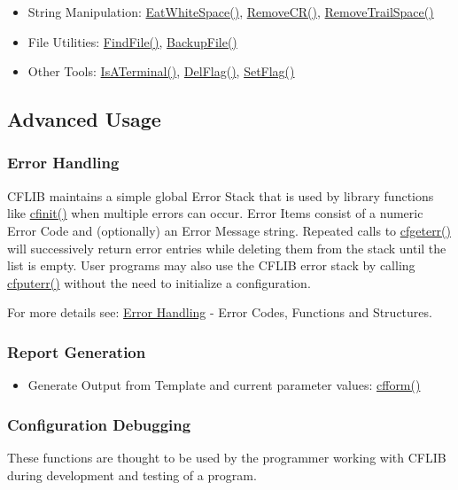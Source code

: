 \begin{itemize}
\item String Manipulation: \hyperlink{group__utilities_gb6760d18c7c13f3c80d365abcb6a46b3}{EatWhiteSpace()}, \hyperlink{group__utilities_g869ea1081375ada22168696db002bc58}{RemoveCR()}, \hyperlink{group__utilities_gbb7b78ca5a077167e24637bba539eea1}{RemoveTrailSpace()}\item File Utilities: \hyperlink{group__utilities_g4e4e8f9a03b7f3598b5efd199b9a67c9}{FindFile()}, \hyperlink{group__utilities_g0fccda7427db33b2f73a3b6dca864207}{BackupFile()}\item Other Tools: \hyperlink{group__utilities_g9a90e738d03b642f33901600671d225a}{IsATerminal()}, \hyperlink{group__utilities_gbfbf02b37e47027916f3352798f7d44c}{DelFlag()}, \hyperlink{group__utilities_gfcc4d6e712f81df21ea69277d42af839}{SetFlag()}\end{itemize}
\hypertarget{index_advanced}{}\subsection{Advanced Usage}\label{index_advanced}
\hypertarget{index_error_handling}{}\subsubsection{Error Handling}\label{index_error_handling}
CFLIB maintains a simple global Error Stack that is used by library functions like \hyperlink{group__cflib__core_ge593ff607f853bd5fc16a16bb6759314}{cfinit()} when multiple errors can occur. Error Items consist of a numeric Error Code and (optionally) an Error Message string. Repeated calls to \hyperlink{group__errors_g2dc49b60b3ec7a82086e60f4b1c41e18}{cfgeterr()} will successively return error entries while deleting them from the stack until the list is empty. User programs may also use the CFLIB error stack by calling \hyperlink{group__errors_gad2687826308f21b54657d2728e4cfcc}{cfputerr()} without the need to initialize a configuration.

For more details see: \hyperlink{group__errors}{Error Handling} - Error Codes, Functions and Structures. \hypertarget{index_reports}{}\subsubsection{Report Generation}\label{index_reports}
\begin{itemize}
\item Generate Output from Template and current parameter values: \hyperlink{group__report__generation_g2f8350e7d032c87b2a0e1cb6149a85ec}{cfform()}\end{itemize}
\hypertarget{index_debugging}{}\subsubsection{Configuration Debugging}\label{index_debugging}
These functions are thought to be used by the programmer working with CFLIB during development and testing of a program.

